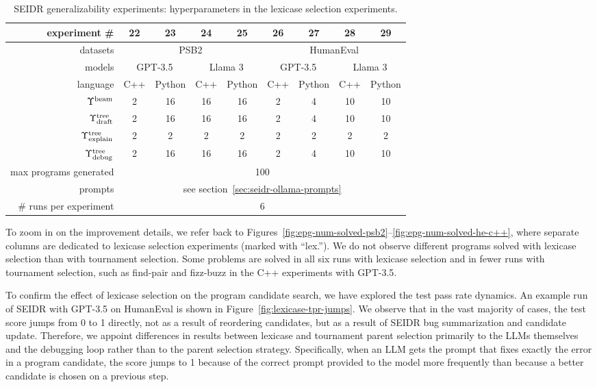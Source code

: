 \begin{table}
\setlength{\tabcolsep}{4pt}
\centering
\caption{SEIDR generalizability experiments: hyperparameters in the lexicase selection experiments.}\small
\label{tab:lexicase-selection-hyperparameters}
\begin{tabular}{rcccc|cccc}
\toprule
experiment \# & 22 & 23 & 24 & 25 & 26 & 27 & 28 & 29 \\
\midrule
datasets  & \multicolumn{4}{c|}{PSB2} & \multicolumn{4}{c}{HumanEval}  \\ 
\midrule
models  & 
\multicolumn{2}{c|}{GPT-3.5} &
\multicolumn{2}{c|}{Llama 3} &
\multicolumn{2}{c|}{GPT-3.5} &
\multicolumn{2}{c}{Llama 3}\\ 
\midrule
language  & C++ & Python & C++ & \multicolumn{1}{c|}{Python} & C++ & Python & C++ & Python \\
\midrule
$\Upsilon^\text{beam}{}$ & 2 & 16 & 16 & 16 & 2 & 4 & 10 & 10  \\
$\Upsilon^\text{tree}_\text{draft}$ & 2 & 16 & 16 & 16 & 2 & 4 & 10 & 10  \\
$\Upsilon^\text{tree}_\text{explain}$ & 2 & 2 & 2 & 2 & 2 & 2 & 2 & 2 \\
$\Upsilon^\text{tree}_\text{debug}$ & 2 & 16 & 16 & 16 & 2 & 4 & 10 & 10 \\
\midrule
max programs generated & \multicolumn{8}{c}{100} \\
prompts & \multicolumn{8}{c}{see section~\ref{sec:seidr-ollama-prompts}} \\
\# runs per experiment &  \multicolumn{8}{c}{6} \\
\bottomrule
\end{tabular}
\end{table}



To zoom in on the improvement details, we refer back to Figures~\ref{fig:epg-num-solved-psb2}--\ref{fig:epg-num-solved-he-c++}, where separate columns are dedicated to lexicase selection experiments (marked with ``lex.'').
We do not observe different programs solved with lexicase selection than with tournament selection. 
Some problems are solved in all six runs with lexicase selection and in fewer runs with tournament selection, such as find-pair and fizz-buzz in the C++ experiments with GPT-3.5.

To confirm the effect of lexicase selection on the program candidate search, we have explored the test pass rate dynamics.
An example run of SEIDR with GPT-3.5 on HumanEval is shown in Figure~\ref{fig:lexicase-tpr-jumps}.
We observe that in the vast majority of cases, the test score jumps from 0 to 1 directly, not as a result of reordering candidates, but as a result of SEIDR  bug summarization and candidate update.
Therefore, we appoint differences in results between lexicase and tournament parent selection primarily to the LLMs themselves and the debugging loop rather than to the parent selection strategy. 
Specifically, when an LLM gets the prompt that fixes exactly the error in a program candidate, the score jumps to 1 because of the correct prompt provided to the model more frequently than because a better candidate is chosen on a previous step.



